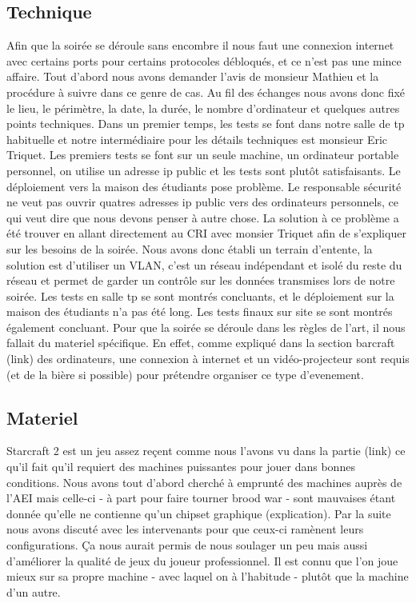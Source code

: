 \subsection{Technique}%
\label{sub:technique}

Afin que la soirée se déroule sans encombre il nous faut une connexion
internet avec certains ports pour certains protocoles débloqués, et ce
n'est pas une mince affaire. Tout d'abord nous avons demander l'avis de
monsieur Mathieu et la procédure à suivre dans ce genre de cas.  Au fil
des échanges nous avons donc fixé le lieu, le périmètre, la date, la
durée, le nombre d'ordinateur et quelques autres points techniques.
Dans un premier temps, les tests se font dans notre salle de tp
habituelle et notre intermédiaire pour les détails techniques est
monsieur Eric Triquet.  Les premiers tests se font sur un seule machine,
un ordinateur portable personnel, on utilise un adresse ip public et les
tests sont plutôt satisfaisants.  Le déploiement vers la maison des
étudiants pose problème. Le responsable sécurité ne veut pas ouvrir
quatres adresses ip public vers des ordinateurs personnels, ce qui veut
dire que nous devons penser à autre chose.  La solution à ce problème a
été trouver en allant directement au CRI avec monsier Triquet afin de
s'expliquer sur les besoins de la soirée.  Nous avons donc établi un
terrain d'entente, la solution est d'utiliser un VLAN, c'est un réseau
indépendant et isolé du reste du réseau et permet de garder un contrôle
sur les données transmises lors de notre soirée.  Les tests en salle tp
se sont montrés concluants, et le déploiement sur la maison des
étudiants n'a pas été long.  Les tests finaux sur site se sont montrés
également concluant.
Pour que la soirée se déroule dans les règles de l'art, il nous fallait
du materiel spécifique. En effet, comme expliqué dans la section
barcraft (link) des ordinateurs, une connexion à internet et un
vidéo-projecteur sont requis (et de la bière si possible) pour prétendre
organiser ce type d'evenement.

\subsection{Materiel}%
\label{sub:materiel}

  Starcraft 2 est un jeu assez reçent comme nous l'avons vu dans la
partie (link) ce qu'il fait qu'il requiert des machines puissantes pour jouer
dans bonnes conditions. Nous avons tout d'abord cherché à emprunté des
machines auprès de l'AEI mais celle-ci - à part pour faire tourner brood
war - sont mauvaises étant donnée qu'elle ne contienne qu'un chipset
graphique (explication). Par la suite nous avons discuté avec les
intervenants pour que ceux-ci ramènent leurs configurations. Ça nous
aurait permis de nous soulager un peu mais aussi d'améliorer la qualité
de jeux du joueur professionnel. Il est connu que l'on joue mieux sur sa
propre machine - avec laquel on à l'habitude - plutôt que la machine d'un
autre.

